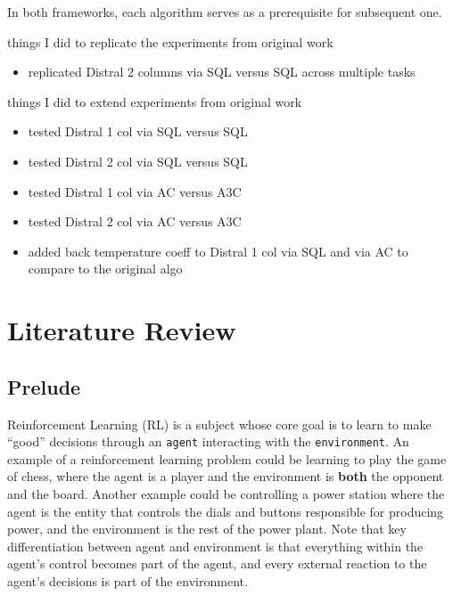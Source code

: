 \documentclass[12pt]{report}
\begin{document}
In both frameworks, each algorithm serves as a prerequisite for subsequent one.


things I did to replicate the experiments from original work
\begin{itemize}
	\item replicated Distral 2 columns via SQL versus SQL across multiple tasks
\end{itemize}
things I did to extend experiments from original work
\begin{itemize}
	\item tested Distral 1 col via SQL versus SQL
	\item tested Distral 2 col via SQL versus SQL
	\item tested Distral 1 col via AC versus A3C
	\item tested Distral 2 col via AC versus A3C
	\item added back temperature coeff to Distral 1 col via SQL and via AC to compare to the original algo
\end{itemize}




\chapter{Literature Review}
\section{Prelude}

Reinforcement Learning (RL) is a subject whose core goal is to learn to make ``good'' decisions through an \texttt{agent} interacting with the \texttt{environment}. An example of a reinforcement learning problem could be learning to play the game of chess, where the agent is a player and the environment is \textbf{both} the opponent and the board. Another example could be controlling a power station where the agent is the entity that controls the dials and buttons responsible for producing power, and the environment is the rest of the power plant. Note that key differentiation between agent and environment is that everything within the agent's control becomes part of the agent, and every external reaction to the agent's decisions is part of the environment.\\

\end{document}
